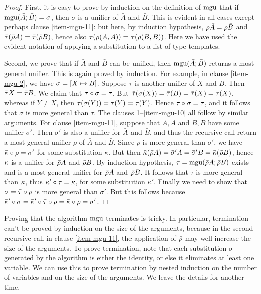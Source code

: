 \documentclass{article}
\begin{document}
\begin{proof}
  First, it is easy to prove by induction on the definition of $\mathop{\rm mgu}$
  that if $\mathop{\rm mgu}(\bar{A};\bar{B})=\sigma$, then $\sigma$ is a unifier
  of $\bar{A}$ and $\bar{B}$. This is evident in all cases except
  perhaps clause \ref{item-mgu-11}: but here, by induction hypothesis,
  $\bar{\rho}\bar{A}=\bar{\rho}\bar{B}$ and $\bar{\tau}(\bar{\rho}
  A)=\bar{\tau}(\bar{\rho} B)$, hence also
  $\bar{\tau}(\bar{\rho}(A,\bar{A}))=\bar{\tau}(\bar{\rho}(B,\bar{B}))$. Here we
  have used the evident notation of applying a substitution to a list
  of type templates.
  
  Second, we prove that if $\bar{A}$ and $\bar{B}$ can be unified,
  then $\mathop{\rm mgu}(\bar{A};\bar{B})$ returns a most general unifier.
  This is again proved by induction. For example, in clause
  \ref{item-mgu-2}, we have $\sigma=[X\mapsto B]$. Suppose
  $\tau$ is another unifier of $X$ and $B$.  Then $\bar{\tau} X=\bar{\tau}
  B$. We claim that $\bar{\tau}\circ\sigma=\tau$. But $\bar{\tau}(\sigma(X)) =
  \bar{\tau}(B) = \bar{\tau}(X) = \tau(X)$, whereas if $Y\neq X$, then
  $\bar{\tau}(\sigma(Y))=\bar{\tau}(Y)=\tau(Y)$. Hence
  $\bar{\tau}\circ\sigma=\tau$, and it follows that $\sigma$ is more
  general than $\tau$. The clauses 1--\ref{item-mgu-10} all follow by
  similar arguments.  For clause {\ref{item-mgu-11}}, suppose that
  $A,\bar{A}$ and $B,\bar{B}$ have some unifier $\sigma'$. Then
  $\sigma'$ is also a unifier for $\bar{A}$ and $\bar{B}$, and thus
  the recursive call return a most general unifier $\rho$ of $\bar{A}$
  and $\bar{B}$. Since $\rho$ is more general than $\sigma'$, we have
  $\bar{\kappa}\circ\rho=\sigma'$ for some substitution $\kappa$. But then
  $\bar{\kappa}(\bar{\rho} A)=\bar{\sigma}' A=\bar{\sigma}' B=\bar{\kappa}(\bar{\rho}
  B)$, hence $\bar{\kappa}$ is a unifier for $\bar{\rho} A$ and $\bar{\rho} B$.
  By induction hypothesis, $\tau=\mathop{\rm mgu}(\bar{\rho} A;\bar{\rho} B)$ exists and
  is a most general unifier for $\bar{\rho} A$ and $\bar{\rho} B$. It
  follows that $\tau$ is more general than $\bar{\kappa}$, thus
  $\bar{\kappa}'\circ\tau = \bar{\kappa}$, for some substitution $\kappa'$.
  Finally we need to show that $\sigma=\bar{\tau} \circ \rho$ is more
  general than $\sigma'$. But this follows because
  $\bar{\kappa}'\circ\sigma = \bar{\kappa}'\circ\bar{\tau}\circ\rho =
  \bar{\kappa}\circ\rho=\sigma'$. \eot
\end{proof}

\begin{remark}
  Proving that the algorithm $\mathop{\rm mgu}$ terminates is tricky. In
  particular, termination can't be proved by induction on the size of
  the arguments, because in the second recursive call in clause
  \ref{item-mgu-11}, the application of $\bar{\rho}$ may well increase
  the size of the arguments. To prove termination, note that each
  substitution $\sigma$ generated by the algorithm is either the
  identity, or else it eliminates at least one variable. We can use
  this to prove termination by nested induction on the number of
  variables and on the size of the arguments. We leave the details for
  another time.
\end{remark}
\end{document}
